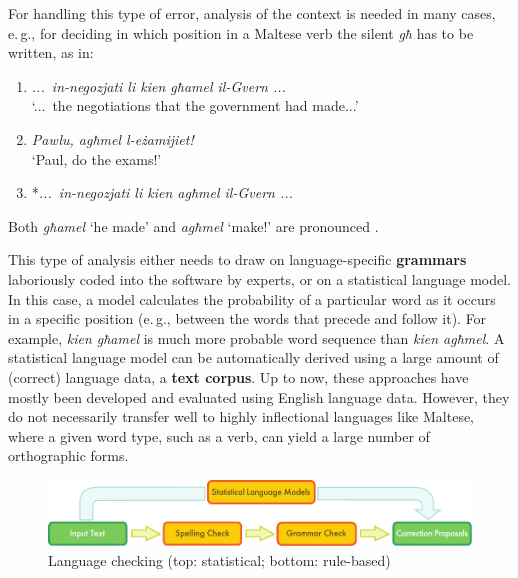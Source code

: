 \begin{multicols}{2}
For handling this type of error, analysis of the context is needed in many cases, e.\,g., for deciding in which position in a Maltese verb the silent \emph{għ} has to be written, as in:

\begin{enumerate} %
\item \emph{...~in-negozjati li kien għamel il-Gvern ...}\\
`...~the negotiations that the government had made...'

\item \emph{Pawlu, agħmel l-eżamijiet!} \\
`Paul, do the exams!'

\item *\emph{...~in-negozjati li kien agħmel il-Gvern ...}
\end{enumerate}
 
Both \emph{għamel} `he made' and \emph{agħmel} `make!' are pronounced .

This type of analysis either needs to draw on language-specific \textbf{grammars} laboriously coded into the software by experts, or on a statistical language model. In this case, a model calculates the probability of a particular word as it occurs in a specific position (e.\,g., between the words that precede and follow it). For example, \emph{kien għamel} is much more probable word sequence than \emph{kien agħmel}. A statistical language model can be automatically derived using a large amount of (correct) language data, a \textbf{text corpus}. Up to now, these approaches have mostly been developed and evaluated using English language data. However, they do not necessarily transfer well to highly inflectional languages like Maltese, where a given word type, such as a verb, can yield a large number of orthographic forms. 

\begin{figure}[htb]
  \center
  \includegraphics[width=\textwidth]{../_media/english/language_checking}
  \caption{Language checking (top: statistical; bottom: rule-based)}
\label{fig:langcheckingaarch_en}
\end{figure}


\end{multicols}
